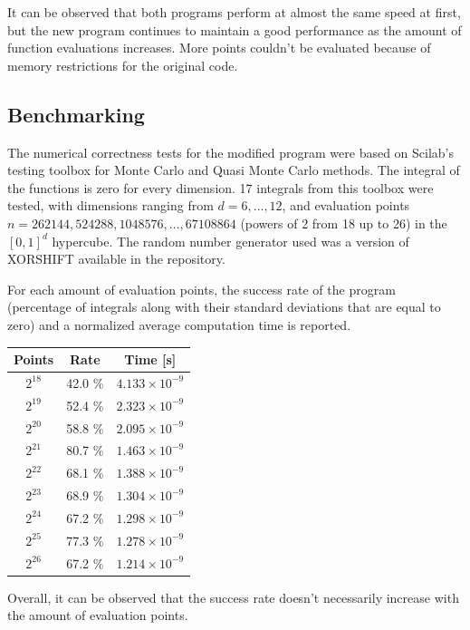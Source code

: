 \documentclass[english]{maciarticle}
\begin{document}
It can be observed that both programs perform at almost the same speed at first, but the new program continues to maintain a good performance as the amount of function evaluations increases. More points couldn't be evaluated because of memory restrictions for the original code.

\subsection*{Benchmarking}

The numerical correctness tests for the modified program were based on Scilab's testing toolbox for Monte Carlo and Quasi Monte Carlo methods\cite{baudin}. The integral of the functions is zero for every dimension. 17 integrals from this toolbox were tested, with dimensions ranging from $d=6,\dots, 12$, and evaluation points $n = 262144, 524288, 1048576, \dots, 67108864$ (powers of 2 from 18 up to 26) in the $[0, 1]^d$ hypercube. The random number generator used was a version of XORSHIFT available in the repository.

For each amount of evaluation points, the success rate of the program (percentage of integrals along with their standard deviations that are equal to zero) and a normalized average computation time is reported.

\begin{center}
	\begin{tabular}{ccc}
		\hline
		Points & Rate & Time [s] \\
		\hline
		$2^{18}$ & 42.0 \% & $4.133 \times 10^{-9}$\\
		$2^{19}$ & 52.4 \% & $2.323 \times 10^{-9}$\\
		$2^{20}$ & 58.8 \% & $2.095 \times 10^{-9}$\\
		$2^{21}$ & 80.7 \% & $1.463 \times 10^{-9}$\\
		$2^{22}$ & 68.1 \% & $1.388 \times 10^{-9}$\\
		$2^{23}$ & 68.9 \% & $1.304 \times 10^{-9}$\\
		$2^{24}$ & 67.2 \% & $1.298 \times 10^{-9}$\\
		$2^{25}$ & 77.3 \% & $1.278 \times 10^{-9}$\\
		$2^{26}$ & 67.2 \% & $1.214 \times 10^{-9}$\\
		\hline
	\end{tabular}
\end{center}

Overall, it can be observed that the success rate doesn't necessarily increase with the amount of evaluation points.
\end{document}
